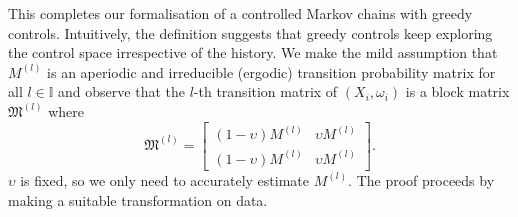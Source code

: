 \documentclass[opre,sglanonrev]{informs4}
\numberwithin{equation}{section}
\newcommand{\pow}[1]{^{(#1)}}
\newcommand{\Ibb}{\mathbb{I}}
\renewcommand{\mc}{\mathfrak{M}}
\begin{document}
\begin{APPENDICES}
\begin{definition}
\end{definition}
This completes our formalisation of a controlled Markov chains with greedy controls. 
Intuitively, the definition suggests that greedy controls keep exploring the control space irrespective of the history.
We make the mild assumption that $M\pow{l}$ is an aperiodic and irreducible (ergodic) transition probability matrix for all $l\in\Ibb$ and observe that the $l$-th transition matrix of $(X_i,\omega_i)$ is a block matrix $\mc\pow{l}$ where
\[
\mc\pow{l} = \begin{bmatrix}
(1-\upsilon)M\pow{l} & \upsilon M\pow{l}\\
(1-\upsilon)M\pow{l} & \upsilon M\pow{l}
\end{bmatrix}.
\]
$\upsilon$ is fixed, so we only need to accurately estimate $M\pow{l}$. The proof proceeds by making a suitable transformation on data.

\end{APPENDICES}
\end{document}
